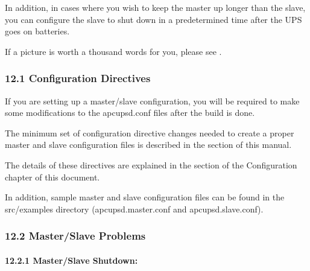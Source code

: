 In addition, in cases where you wish to keep the master up longer than the
slave, you can configure the slave to shut down in a predetermined time after
the UPS goes on batteries.  

If a picture is worth a thousand words for you, please see 
. 

\label{Configuration-Directives}

\subsubsection*{12.1 Configuration Directives}

\label{index-Directives-153}
\label{index-Configuration_002c-Directives-154}
If you are setting up a master/slave configuration, you will be required to
make some modifications to the apcupsd.conf files after the build is done.  

The minimum set of configuration directive changes needed to create a proper
master and slave configuration files is described in the 
 section of
this manual.  

The details of these directives are explained in the 
 section of the
Configuration chapter of this document.  

In addition, sample master and slave configuration files can be found in the
\lt{}src\gt{}/examples directory (apcupsd.master.conf and apcupsd.slave.conf).


\label{Master_002fSlave-Problems}

\subsubsection*{12.2 Master/Slave Problems}

\label{index-Master_002fSlave-155}
\label{index-Problems_002c-Master_002fslave-156}

\label{Master_002fSlave-Shutdown}

\paragraph*{12.2.1 Master/Slave Shutdown:}

